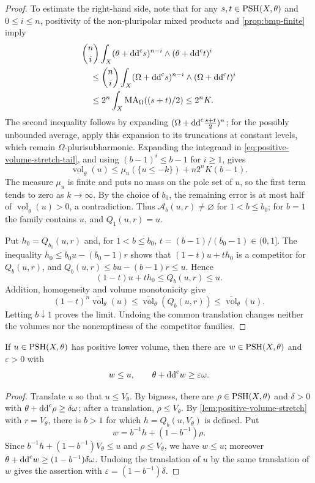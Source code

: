 \begin{proof}
To estimate the right-hand side, note that for any $s,t\in\mathrm{PSH}(X,\theta)$ and $0\leq i\leq n$, positivity of the non-pluripolar mixed products and \cref{prop:bmp-finite} imply
\[
 \begin{aligned}
 &\binom ni\int_X(\theta+\mathrm{dd}^{\mathrm{c}} s)^{n-i}\wedge(\theta+\mathrm{dd}^{\mathrm{c}} t)^i\\
 &\quad\leq\binom ni\int_X(\Omega+\mathrm{dd}^{\mathrm{c}} s)^{n-i}\wedge(\Omega+\mathrm{dd}^{\mathrm{c}} t)^i\\
 &\quad\leq2^n\int_X\mathrm{MA}_\Omega((s+t)/2)\leq2^nK.
 \end{aligned}
\]
The second inequality follows by expanding $(\Omega+\mathrm{dd}^{\mathrm{c}}\frac{s+t}2)^n$; for the possibly unbounded average, apply this expansion to its truncations at constant levels, which remain $\Omega$-plurisubharmonic. Expanding the integrand in \eqref{eq:positive-volume-stretch-tail}, and using $(b-1)^i\leq b-1$ for $i\geq1$, gives
\[
 \underline{\operatorname{vol}}_\theta(u)
 \leq\mu_u(\{u\leq-k\})+n2^nK(b-1).
\]
The measure $\mu_u$ is finite and puts no mass on the pole set of $u$, so the first term tends to zero as $k\to\infty$. By the choice of $b_0$, the remaining error is at most half of $\underline{\operatorname{vol}}_\theta(u)>0$, a contradiction. Thus $\mathcal A_b(u,r)\neq\varnothing$ for $1<b\leq b_0$; for $b=1$ the family contains $u$, and $Q_1(u,r)=u$.

Put $h_0=Q_{b_0}(u,r)$ and, for $1<b\leq b_0$, $t=(b-1)/(b_0-1)\in(0,1]$. The inequality $h_0\leq b_0u-(b_0-1)r$ shows that $(1-t)u+th_0$ is a competitor for $Q_b(u,r)$, and $Q_b(u,r)\leq bu-(b-1)r\leq u$. Hence
\[
 (1-t)u+th_0\leq Q_b(u,r)\leq u.
\]
Addition, homogeneity and volume monotonicity give
\[
 (1-t)^n\overline{\operatorname{vol}}_\theta(u)
 \leq\overline{\operatorname{vol}}_\theta(Q_b(u,r))
 \leq\overline{\operatorname{vol}}_\theta(u).
\]
Letting $b\downarrow1$ proves the limit. Undoing the common translation changes neither the volumes nor the nonemptiness of the competitor families.
\end{proof}

\begin{corollary}\label{cor:positive-volume-strict-barrier}
If $u\in\mathrm{PSH}(X,\theta)$ has positive lower volume, then there are $w\in\mathrm{PSH}(X,\theta)$ and $\varepsilon>0$ with
\[
 w\leq u,\qquad \theta+\mathrm{dd}^{\mathrm{c}} w\geq\varepsilon\omega.
\]
\end{corollary}
\begin{proof}
Translate $u$ so that $u\leq V_\theta$. By bigness, there are $\rho\in\mathrm{PSH}(X,\theta)$ and $\delta>0$ with $\theta+\mathrm{dd}^{\mathrm{c}}\rho\geq\delta\omega$; after a translation, $\rho\leq V_\theta$. By \cref{lem:positive-volume-stretch} with $r=V_\theta$, there is $b>1$ for which $h=Q_b(u,V_\theta)$ is defined. Put
\[
 w=b^{-1}h+(1-b^{-1})\rho.
\]
Since $b^{-1}h+(1-b^{-1})V_\theta\leq u$ and $\rho\leq V_\theta$, we have $w\leq u$; moreover $\theta+\mathrm{dd}^{\mathrm{c}} w\geq(1-b^{-1})\delta\omega$. Undoing the translation of $u$ by the same translation of $w$ gives the assertion with $\varepsilon=(1-b^{-1})\delta$.
\end{proof}

